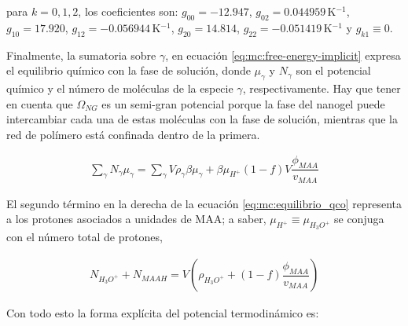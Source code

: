	
	\noindent para  $k=0,1,2$, los coeficientes son: $g_{00}= -12.947$, $g_{02}=0.044959\,$K$^{-1}$, $g_{10}= 17.920$, $g_{12}= -0.056944$\,K$^{-1}$, $g_{20}= 14.814$, $g_{22}= -0.051419$\,K$^{-1}$  y $g_{k1}\equiv 0$. \cite{afroze2000}
	
	
	
	
	Finalmente, la sumatoria sobre $\gamma$, en ecuaci\'on \ref{eq:mc:free-energy-implicit} expresa el equilibrio qu\'imico con la fase de soluci\'on, donde $\mu_\gamma$ y $N_\gamma$ son el potencial qu\'imico y el n\'umero de mol\'eculas de la especie $\gamma$, respectivamente.
	Hay que tener en cuenta que $\Omega_{NG}$ es un semi-gran potencial porque la fase del nanogel puede intercambiar cada una de estas mol\'eculas con la fase de soluci\'on, mientras que la red de pol\'imero est\'a confinada dentro de la primera.
	
	
	\begin{align}
		\sum_\gamma N_\gamma \mu_\gamma = \sum_{\gamma }V{\rho_\gamma\beta\mu_\gamma}
		+ \beta\mu_{H^+}(1-f)V\dfrac{\phi_{MAA}}{v_{MAA}}
		\label{eq:mc:equilibrio_qco}
	\end{align}
	
	El segundo t\'ermino en la derecha de la ecuaci\'on \ref{eq:mc:equilibrio_qco} representa a los protones asociados a unidades de MAA;
	a saber, $\mu_{H^+}\equiv\mu_{H_3O^+}$ se conjuga con el n\'umero total de protones,
	
	\begin{align}
		N_{H_3O^+}+N_{MAAH}=V\left(\rho_{H_3O^+}+(1-f)\dfrac{\phi_{MAA}}{v_{MAA}}\right)
		\label{eq:mc:equilibrio}
	\end{align}
	
	
	
	Con todo esto la forma expl\'icita del potencial termodin\'amico es:
	
	
	
